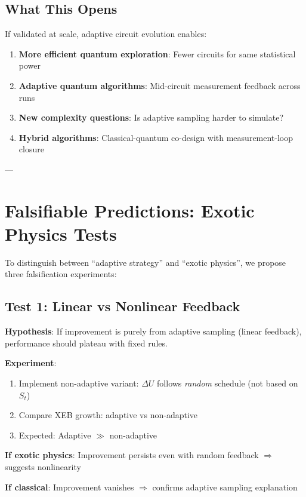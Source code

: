 \documentclass[twocolumn]{article}
\begin{document}
\subsection{What This Opens}

If validated at scale, adaptive circuit evolution enables:

\begin{enumerate}
\item \textbf{More efficient quantum exploration}: Fewer circuits for same statistical power
\item \textbf{Adaptive quantum algorithms}: Mid-circuit measurement feedback across runs
\item \textbf{New complexity questions}: Is adaptive sampling harder to simulate?
\item \textbf{Hybrid algorithms}: Classical-quantum co-design with measurement-loop closure
\end{enumerate}

---

\section{Falsifiable Predictions: Exotic Physics Tests}

To distinguish between ``adaptive strategy'' and ``exotic physics'', we propose three falsification experiments:

\subsection{Test 1: Linear vs Nonlinear Feedback}

\textbf{Hypothesis}: If improvement is purely from adaptive sampling (linear feedback), performance should plateau with fixed rules.

\textbf{Experiment}:
\begin{enumerate}
\item Implement non-adaptive variant: $\Delta U$ follows \textit{random} schedule (not based on $S_t$)
\item Compare XEB growth: adaptive vs non-adaptive
\item Expected: Adaptive $\gg$ non-adaptive
\end{enumerate}

\textbf{If exotic physics}: Improvement persists even with random feedback $\Rightarrow$ suggests nonlinearity

\textbf{If classical}: Improvement vanishes $\Rightarrow$ confirms adaptive sampling explanation
\end{document}
